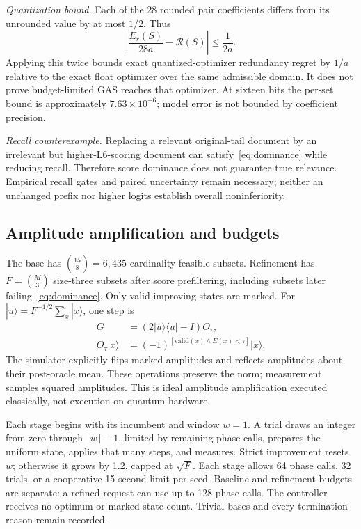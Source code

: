 \documentclass[conference]{IEEEtran}
\newcommand{\red}{\mathcal{R}}
\begin{document}
\textit{Quantization bound.} Each of the 28 rounded pair coefficients differs from its unrounded value by at most \(1/2\). Thus
\begin{equation}
\left|\frac{E_r(S)}{28a}-\red(S)\right|\leq\frac{1}{2a}.\label{eq:refine_bound}
\end{equation}
Applying this twice bounds exact quantized-optimizer redundancy regret by \(1/a\) relative to the exact float optimizer over the same admissible domain. It does not prove budget-limited GAS reaches that optimizer. At sixteen bits the per-set bound is approximately \(7.63\times10^{-6}\); model error is not bounded by coefficient precision.

\textit{Recall counterexample.} Replacing a relevant original-tail document by an irrelevant but higher-L6-scoring document can satisfy~\eqref{eq:dominance} while reducing recall. Therefore score dominance does not guarantee true relevance. Empirical recall gates and paired uncertainty remain necessary; neither an unchanged prefix nor higher logits establish overall noninferiority.

\subsection{Amplitude amplification and budgets}
The base has \(\binom{15}{8}=6{,}435\) cardinality-feasible subsets. Refinement has \(F=\binom{M}{3}\) size-three subsets after score prefiltering, including subsets later failing~\eqref{eq:dominance}. Only valid improving states are marked. For \(|u\rangle=F^{-1/2}\sum_x|x\rangle\), one step is
\begin{align}
G&=(2|u\rangle\langle u|-I)O_\tau,\\
O_\tau|x\rangle&=(-1)^{[\mathrm{valid}(x)\land E(x)<\tau]}|x\rangle.\label{eq:grover}
\end{align}
The simulator explicitly flips marked amplitudes and reflects amplitudes about their post-oracle mean. These operations preserve the norm; measurement samples squared amplitudes. This is ideal amplitude amplification executed classically, not execution on quantum hardware.

Each stage begins with its incumbent and window \(w=1\). A trial draws an integer from zero through \(\lceil w\rceil-1\), limited by remaining phase calls, prepares the uniform state, applies that many steps, and measures. Strict improvement resets \(w\); otherwise it grows by 1.2, capped at \(\sqrt F\). Each stage allows 64 phase calls, 32 trials, or a cooperative 15-second limit per seed. Baseline and refinement budgets are separate: a refined request can use up to 128 phase calls. The controller receives no optimum or marked-state count. Trivial bases and every termination reason remain recorded.
\end{document}
